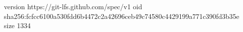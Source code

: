 version https://git-lfs.github.com/spec/v1
oid sha256:fcfcc6100a530fdd6b4472c2a42696ceb49c74580c4429199a771c390fd3b35e
size 1334
